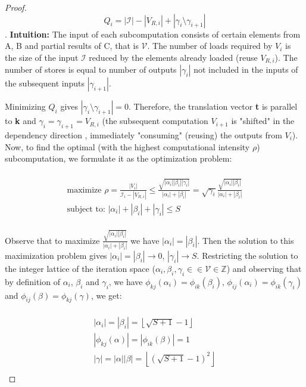 \documentclass[sigplan,review,anonymous]{acmart}\settopmatter{printfolios=true,printccs=false,printacmref=false}
\begin{document}
\begin{proof}
 $$Q_i = |\mathcal{I}| - |V_{R,i}| + |\gamma_i \setminus \gamma_{i+1}|$$.
 \textbf{Intuition:} The input of each subcomputation consists of certain 
 elements from A, B and partial results of C, that is $\mathcal{V}$. The number 
 of loads required by $V_i$ is the size of the input $\mathcal{I}$ reduced by 
 the elements already loaded (reuse $V_{R,i}$). The number of stores is equal 
 to number of outputs $|\gamma_i|$ not included in the inputs of the subsequent 
 inputs $|\gamma_{i+1}|$.
 
 Minimizing $Q_i$ gives $|\gamma_i \setminus \gamma_{i+1}| = 0$. Therefore, the 
 translation vector \textbf{t} is parallel to \textbf{k} and $\gamma_i = 
 \gamma_{i+1} = V_{R,i}$ (the subsequent computation $V_{i+1}$ is "shifted" in 
 the 
 dependency direction , immediately "consuming" (reusing) the outputs 
 from $V_i$). Now, to find the optimal (with the highest computational 
 intensity $\rho$)
 subcomputation, we formulate it as the optimization problem:
 
 \begin{multline}
 \\
 \text{maximize } \rho = \frac{|V_i|}{\mathcal{I}_i - |V_{R,i}|} \le 
 \frac{\sqrt{|\alpha_i| |\beta_i| |\gamma_i|}}{|\alpha_i| + |\beta_i|} = 
 \sqrt{\gamma_i}\frac{\sqrt{|\alpha_i| |\beta_i|}}{|\alpha_i| + |\beta_i|}\\
 \text{subject to: } |\alpha_i| + |\beta_i| + |\gamma_i| \le S \\
 \end{multline}
 
 Observe that to maximize $\frac{\sqrt{|\alpha_i| |\beta_i|}}{|\alpha_i| + 
 |\beta_i|}$ 
 we have $|\alpha_i| = |\beta_i|$. Then the solution to this maximization 
 problem gives  
 $|\alpha_i| = |\beta_i|
 \rightarrow 0$, $|\gamma_i| \rightarrow S$.  Restricting the solution to the 
 integer lattice of the iteration space ($\alpha_i, \beta_i,
 \gamma_i \in \in \mathcal{V} \in \mathbb{Z}$) and observing that by definition 
 of $\alpha_i$, 
 $\beta_i$ and $\gamma_i$, we have $\phi_{kj}(\alpha_i) = \phi_{ik}(\beta_i)$, 
 $\phi_{ij}(\alpha_i) = \phi_{ik}(\gamma_i)$ and $\phi_{ij}(\beta) = 
 \phi_{kj}(\gamma)$, we get:
 
 \begin{multline}
 \label{eq:seqSolution}
 \\
  |\alpha_i| = |\beta_i|= \left \lfloor{\sqrt{S + 1} - 1} \right \rfloor \\
 |\phi_{kj}(\alpha)| = |\phi_{ik}(\beta)| = 1 \\
 |\gamma| = |\alpha| |\beta| = \left \lfloor{(\sqrt{S + 1} - 1)^2} \right 
 \rfloor 
\\
 \end{multline}
 


\end{proof}
\end{document}
